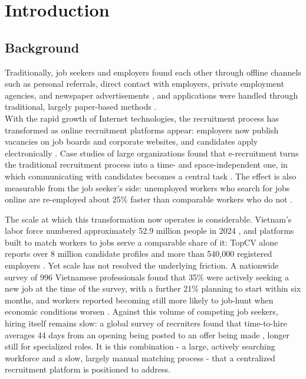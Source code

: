 
\chapter{Introduction}
\label{chapter:introduction}

\section{Background}

Traditionally, job seekers and employers found each other through offline channels such as personal referrals, direct contact with employers, private employment agencies, and newspaper advertisements \cite{autor2001wiring}, and applications were handled through traditional, largely paper-based methods \cite{chapman2003technologies}.\\
With the rapid growth of Internet technologies, the recruitment process has transformed as online recruitment platforms appear: employers now publish vacancies on job boards and corporate websites, and candidates apply electronically \cite{autor2001wiring, chapman2003technologies}. Case studies of large organizations found that e-recruitment turns the traditional recruitment process into a time- and space-independent one, in which communicating with candidates becomes a central task \cite{holm2012erecruitment}. The effect is also measurable from the job seeker's side: unemployed workers who search for jobs online are re-employed about 25\% faster than comparable workers who do not \cite{kuhn2014internet}.

The scale at which this transformation now operates is considerable. Vietnam's labor force numbered approximately 52.9 million people in 2024 \cite{gso2024lfs}, and platforms built to match workers to jobs serve a comparable share of it: TopCV alone reports over 8 million candidate profiles and more than 540,000 registered employers \cite{topcv2023report}. Yet scale has not resolved the underlying friction. A nationwide survey of 996 Vietnamese professionals found that 35\% were actively seeking a new job at the time of the survey, with a further 21\% planning to start within six months, and workers reported becoming still more likely to job-hunt when economic conditions worsen \cite{michaelpage2023}. Against this volume of competing job seekers, hiring itself remains slow: a global survey of recruiters found that time-to-hire averages 44 days from an opening being posted to an offer being made \cite{amsbersin2023}, longer still for specialized roles. It is this combination - a large, actively searching workforce and a slow, largely manual matching process - that a centralized recruitment platform is positioned to address.


